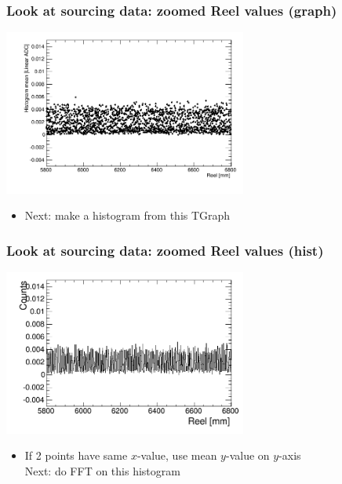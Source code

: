 \documentclass[bigger]{beamer}
\begin{document}
\begin{frame}
\frametitle{Look at sourcing data: zoomed Reel values (graph)}
\label{sec-3-1-3}
\label{sec-3-1-3-1}

\centering
\includegraphics[width=0.6\textwidth]{fig/sourcing_zoomed_plot.png}
\begin{itemize}

\item Next: make a histogram from this TGraph
\label{sec-3-1-3-2}%
\end{itemize} %
\end{frame}
\begin{frame}
\frametitle{Look at sourcing data: zoomed Reel values (hist)}
\label{sec-3-1-4}
\label{sec-3-1-4-1}

\centering
\includegraphics[width=0.6\textwidth]{fig/original_histogram.png}
\begin{itemize}

\item If 2 points have same $x$-value, use mean $y$-value on $y$-axis \newline{}\\
\label{sec-3-1-4-2}%
Next: do FFT on this histogram
\end{itemize} %
\end{frame}
\end{document}
